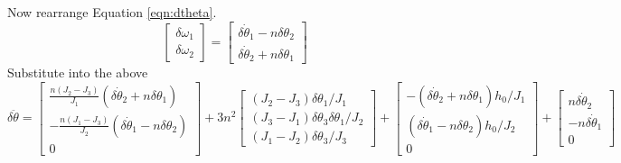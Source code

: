 \documentclass[]{article}
\begin{document}
Now rearrange Equation \eqref{eqn:dtheta}.
\begin{equation}
	\begin{bmatrix}
		\delta \omega_1 \\
		\delta \omega_2
	\end{bmatrix} = \begin{bmatrix}
	\delta \dot{\theta}_1 - n \delta \theta_2 \\
	\delta \dot{\theta}_2 + n \delta \theta_1
\end{bmatrix}
\end{equation}
Substitute into the above
\begin{equation}
	\delta \ddot{\theta} = \begin{bmatrix}
		\frac{n(J_2 - J_3)}{J_1} \left(\delta \dot{\theta}_2 + n \delta \theta_1\right) \\
		-\frac{n(J_1 - J_3)}{J_2} \left(\delta \dot{\theta}_1 - n \delta \theta_2\right) \\
		0
	\end{bmatrix} +  3 n^2 \begin{bmatrix}
		(J_2 - J_3) \delta \theta_1/J_1 \\
		(J_3 - J_1) \delta \theta_3 \delta \theta_1/J_2 \\
		(J_1 - J_2) \delta \theta_3/J_3
	\end{bmatrix} + \begin{bmatrix}
		-\left(\delta \dot{\theta}_2 + n \delta \theta_1\right) h_0/J_1 \\
		\left(\delta \dot{\theta}_1 - n \delta \theta_2\right) h_0/J_2 \\
		0
	\end{bmatrix} + \begin{bmatrix}
	n \delta \dot{\theta}_2 \\
	-n \delta \dot{\theta}_1 \\
	0 
\end{bmatrix}
\end{equation}
\end{document}
